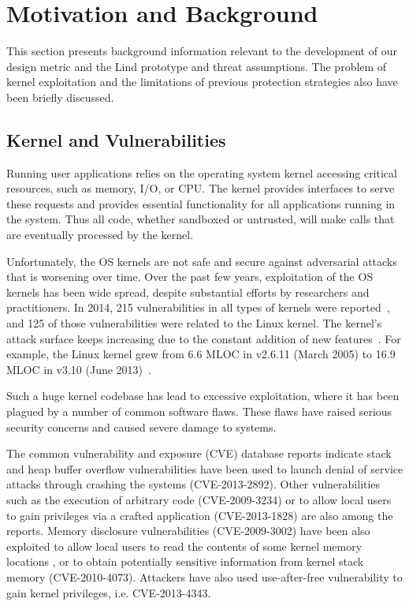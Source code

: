 \section{Motivation and Background}
\label{sec.motivation-and-background}

This section presents background information 
relevant to the development of our design metric and the Lind prototype and threat assumptions. 
The problem of kernel exploitation and the limitations of previous protection strategies also have been briefly discussed. 

\subsection{Kernel and Vulnerabilities}

Running user applications relies on the operating system kernel 
accessing critical resources, such as memory, I/O, or CPU. 
The kernel provides interfaces to serve these requests 
and provides essential functionality for all applications running in the system. 
Thus all code, whether sandboxed or untrusted, will make calls 
that are eventually processed by the kernel. 

Unfortunately, the OS kernels are not safe and secure against adversarial attacks that is worsening over time. 
Over the past few years, exploitation of the OS kernels has been wide
spread, despite substantial efforts by researchers and practitioners. 
In 2014, 215 vulnerabilities in all types of kernels were reported~\cite{NVD}, 
and 125 of those vulnerabilities were related to the Linux kernel. 
The kernel's attack surface keeps increasing due to the constant addition of new
features~\cite{Metrics-13}. For example, the Linux kernel grew from 6.6 MLOC in v2.6.11 (March 2005) to 16.9 MLOC in v3.10 (June 2013)~\cite{Linux-13}. 


Such a huge kernel codebase has lead to excessive exploitation, where it has been plagued by a number of common
software flaws. 
These flaws have raised serious security concerns and caused severe damage to systems. 

The common vulnerability and exposure (CVE) database reports indicate stack and heap buffer overflow vulnerabilities 
have been used to launch denial of service attacks through crashing the systems (CVE-2013-2892).
Other vulnerabilities such as the execution of arbitrary code (CVE-2009-3234) 
or to allow local users to gain privileges via a crafted 
application (CVE-2013-1828) are also among the reports.
Memory disclosure vulnerabilities (CVE-2009-3002) have been also exploited to allow local users
to read 
the contents of some kernel memory locations
, or to obtain potentially sensitive information from kernel stack memory (CVE-2010-4073).
Attackers have also used use-after-free vulnerability to gain kernel
privileges, i.e. CVE-2013-4343.

